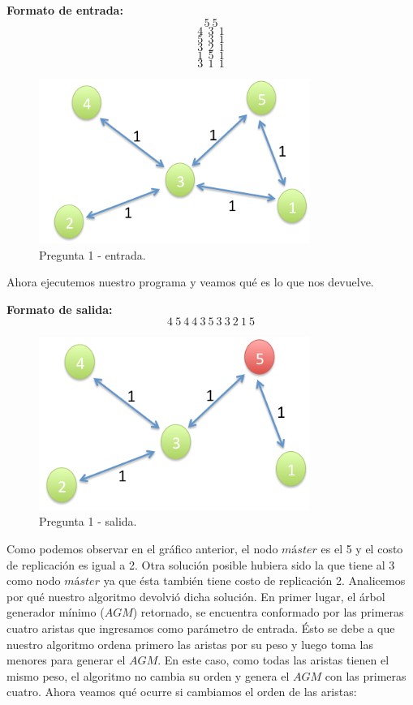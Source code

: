 \textbf{Formato de entrada:}
$$5\ 5$$
$$4\ \ 3\ \ 1$$
$$5\ \ 3\ \ 1$$
$$3\ \ 2\ \ 1$$
$$1\ \ 5\ \ 1$$
$$3\ \ 1\ \ 1$$

\begin{figure}[H] %
\begin{center}
\includegraphics[width=250pt]{../imgs/pregAdicional01.jpg}
\caption{Pregunta 1 - entrada.}
\end{center}
\end{figure}
\newline
Ahora ejecutemos nuestro programa y veamos qué es lo que nos devuelve. \newline


\textbf{Formato de salida:}
$$4\ 5\ 4\ 4\ 3\ 5\ 3\ 3\ 2\ 1\ 5$$

\begin{figure}[H] %
\begin{center}
\includegraphics[width=250pt]{../imgs/pregAdicional02.jpg}
\caption{Pregunta 1 - salida.}
\end{center}
\end{figure}

\newline
Como podemos observar en el gráfico anterior, el nodo $máster$ es el 5 y el costo de replicación es igual a 2. Otra solución posible hubiera sido la que tiene al 3 como nodo $máster$ ya que ésta también tiene costo de replicación 2. \newline
\newline
Analicemos por qué nuestro algoritmo devolvió dicha solución. En primer lugar, el árbol generador mínimo ($AGM$) retornado, se encuentra conformado por las primeras cuatro aristas que ingresamos como parámetro de entrada. Ésto se debe a que nuestro algoritmo ordena primero las aristas por su peso y luego toma las menores para generar el $AGM$. En este caso, como todas las aristas tienen el mismo peso, el algoritmo no cambia su orden y genera el $AGM$ con las primeras cuatro. \newline
\newline
Ahora veamos qué ocurre si cambiamos el orden de las aristas:

